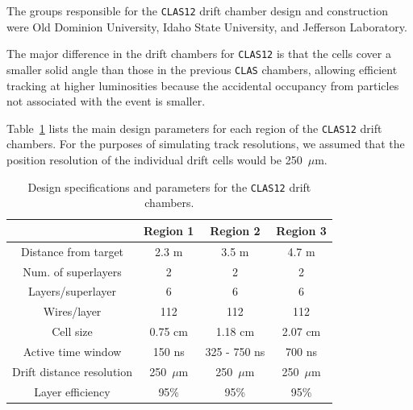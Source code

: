 The groups responsible for the {\tt CLAS12} drift
chamber design and construction were Old Dominion University, Idaho State
University, and Jefferson Laboratory.

The major difference in the drift chambers for {\tt CLAS12} is that the 
cells cover a smaller solid angle than those in the previous {\tt CLAS} 
chambers, allowing efficient tracking at higher luminosities because the 
accidental occupancy from particles not associated with the event is smaller.  

Table~\ref{fwd-dc-design-parms} lists the main design parameters for each 
region of the {\tt CLAS12} drift chambers.  For the purposes of simulating 
track resolutions, we assumed that the position resolution of the individual 
drift cells would be 250~$\mu$m.  

\small{
\begin{table}[ht]
\begin{center}
\begin{tabular}{||c|c|c|c||} \hline \hline
            &{\bf Region 1}&{\bf Region 2}&{\bf Region 3}\\ \hline
Distance from target & 2.3 m    & 3.5 m        & 4.7 m    \\ \hline
Num. of superlayers  & 2        & 2            & 2        \\ \hline
Layers/superlayer    & 6        & 6            & 6        \\ \hline
Wires/layer          & 112      & 112          & 112      \\ \hline
Cell size            & 0.75 cm  & 1.18 cm      & 2.07 cm  \\ \hline
Active time window   & 150 ns   & 325 - 750 ns & 700 ns   \\ \hline
Drift distance resolution   & 250~$\mu$m   & 250~$\mu$m &250~$\mu$m  \\ \hline
Layer efficiency   &  95\%   &  95\%  & 95\%   \\ \hline
\end{tabular}
\caption{\small{Design specifications and parameters for the {\tt CLAS12} drift chambers.}}
\label{fwd-dc-design-parms}
\end{center}
\end{table}
}





